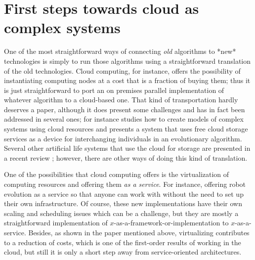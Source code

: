 \documentclass[utf8]{frontiersSCNS} %
\begin{document}
\section{First steps towards cloud as complex systems}

One of the most straightforward ways of connecting {\em old} algorithms to
*new* technologies is simply to run those algorithms using a
straightforward translation of the old technologies. Cloud computing,
for instance, offers the possibility of instantiating computing nodes
at a cost that is a fraction of buying them; thus it is just
straightforward to port an on premises parallel implementation of
whatever algorithm to a cloud-based one. That kind of transportation
hardly deserves a paper, although it does present some challenges and
has in fact been addressed in several ones; for instance \citep{Medel2017}
studies how to create models of complex systems using cloud resources
and \citep{merelo2011evostar} presents a system that uses free cloud
storage services as a device for interchanging individuals in an
evolutionary algorithm. Several other artificial life systems that use
the cloud for storage are presented in a recent review \citep{taylor2016webal}; however, there are other ways of doing this kind
of translation.

One of the possibilities that cloud computing offers
is the virtualization of computing resources and offering them {\em as a
service}. For instance, offering robot evolution as a service
\citep{du2017robot,chen2010robot} so that anyone can work with without the
need to set up their own infrastructure. Of course, these new
implementations have their own scaling and scheduling issues which can
be a challenge, but they are mostly a straightforward implementation
of $x$-as-a-framework-or-implementation to $x$-as-a-service. Besides,
as shown in the paper mentioned above, virtualizing contributes to a
reduction of costs, which is one of the first-order results of working
in the cloud, but still it is only a short step away from
service-oriented architectures.  
\end{document}
